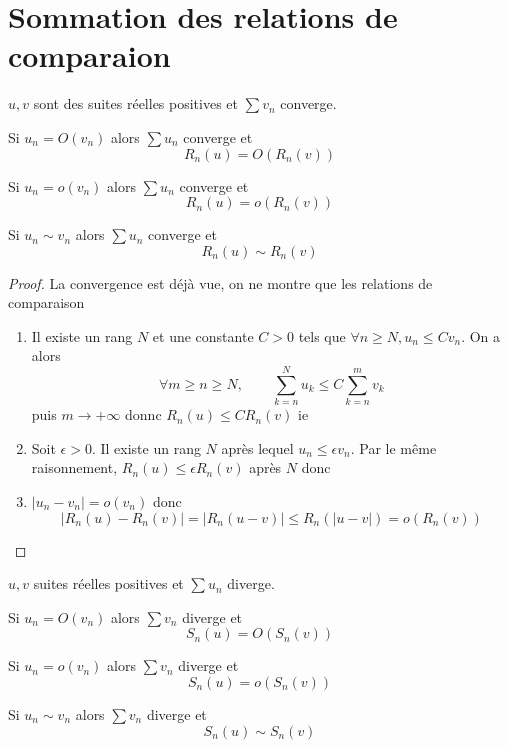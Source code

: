 \section{Sommation des relations de comparaion}

\begin{thm}
    \Hyp $u, v$ sont des suites réelles positives et $\sum v_n$ converge.
    \begin{concenum}
    \item Si $u_n=O(v_n)$ alors $\sum u_n$ converge et \[
            R_n(u)=O(R_n(v))
        \]
    \item Si $u_n=o(v_n)$ alors $\sum u_n$ converge et \[
            R_n(u)=o(R_n(v))
        \]
    \item Si $u_n\sim v_n$ alors $\sum u_n$ converge et \[
            R_n(u)\sim R_n(v)
        \]
    \end{concenum}
\end{thm}

\begin{proof}
    La convergence est déjà vue, on ne montre que les relations de comparaison

    \begin{enumerate}
        \item Il existe un rang $N$ et une constante $C>0$ tels que $\forall n\geq N, u_n\leq Cv_n$. On a alors \[
    \forall m\geq n\geq N, \qquad \sum_{k=n}^Nu_k\leq C\sum_{k=n}^mv_k
            \]
            puis $m\to+\infty$ donnc $R_n(u)\leq CR_n(v)$ ie \conc
        \item Soit $\epsilon>0$. Il existe un rang $N$ après lequel $u_n\leq \epsilon v_n$. Par le même raisonnement, $R_n(u)\leq \epsilon R_n(v)$ après $N$ donc \conc
        \item $|u_n-v_n|=o(v_n)$ donc \[
                |R_n(u)-R_n(v)|=|R_n(u-v)|\leq R_n(|u-v|)=o(R_n(v))
            \]
    \end{enumerate}
\end{proof}

\begin{thm}
    \Hyp $u, v$ suites réelles positives et $\sum u_n$ diverge.
    \begin{concenum}
    
    \item Si $u_n=O(v_n)$ alors $\sum v_n$ diverge et \[
            S_n(u)=O(S_n(v))
        \]
    \item Si $u_n=o(v_n)$ alors $\sum v_n$ diverge et \[
            S_n(u)=o(S_n(v))
        \]
    \item Si $u_n\sim v_n$ alors $\sum v_n$ diverge et \[
            S_n(u)\sim S_n(v)
        \]
    \end{concenum}
\end{thm}

